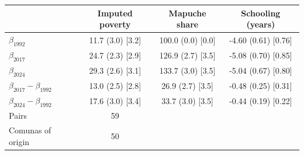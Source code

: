 \begin{tabular}{lccc}
\toprule
 & Imputed poverty & Mapuche share & Schooling (years) \\
\midrule
$\beta_{1992}$ & 11.7 (3.0) [3.2] & 100.0 (0.0) [0.0] & -4.60 (0.61) [0.76] \\
$\beta_{2017}$ & 24.7 (2.3) [2.9] & 126.9 (2.7) [3.5] & -5.08 (0.70) [0.85] \\
$\beta_{2024}$ & 29.3 (2.6) [3.1] & 133.7 (3.0) [3.5] & -5.04 (0.67) [0.80] \\
\midrule
$\beta_{2017}-\beta_{1992}$ & 13.0 (2.5) [2.8] & 26.9 (2.7) [3.5] & -0.48 (0.25) [0.31] \\
$\beta_{2024}-\beta_{1992}$ & 17.6 (3.0) [3.4] & 33.7 (3.0) [3.5] & -0.44 (0.19) [0.22] \\
\midrule
Pairs & 59 & & \\
Comunas of origin & 50 & & \\
\bottomrule
\end{tabular}

